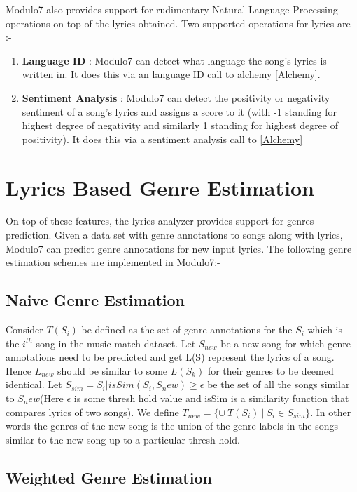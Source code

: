 \noindent Modulo7 also provides support for rudimentary Natural Language Processing operations on top of the lyrics obtained. Two supported operations for lyrics are :-

\begin{enumerate}
\item \textbf{Language ID} : Modulo7 can detect what language the song's lyrics is written in. It does this via an language ID call to alchemy \ref{Alchemy}. 
\item \textbf{Sentiment Analysis} : Modulo7 can detect the positivity or negativity sentiment of a song's lyrics and assigns a score to it (with -1 standing for highest degree of negativity and similarly 1 standing for highest degree of positivity). It does this via a sentiment analysis call to \ref{Alchemy}
\end{enumerate}

\section{Lyrics Based Genre Estimation} \label{genreestimation}

\noindent On top of these features, the lyrics analyzer provides support for genres prediction. Given a data set with genre annotations to songs along with lyrics, Modulo7 can predict genre annotations for new input lyrics. The following genre estimation schemes are implemented in Modulo7:-

\subsection{Naive Genre Estimation} \label{NaiveGenre}

\noindent Consider $T(S_i)$ be defined as the set of genre annotations for the $S_i$ which is the $i^{th}$ song in the music match dataset. Let $S_{new}$ be a new song for which genre annotations need to be predicted and get L(S) represent the lyrics of a song. Hence $L_{new}$ should be similar to some $L(S_k)$ for their genres to be deemed identical. Let $S_{sim} = {S_i | isSim(S_i, S_new) \geq \epsilon} $ be the set of all the songs similar to $S_new$(Here $\epsilon$ is some thresh hold value and isSim is a similarity function that compares lyrics of two songs). We define $T_{new} = \{\cup \ T(S_i) \ | \ S_i \in S_{sim}\}$. In other words the genres of the new song is the union of the genre labels in the songs similar to the new song up to a particular thresh hold.

\subsection{Weighted Genre Estimation} \label{WeightedGenre}

